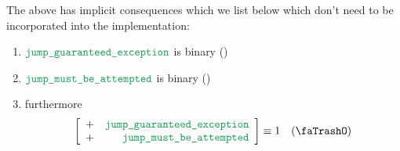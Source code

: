 \saNote{} The above has implicit consequences which we list below which don't need to be incorporated into the implementation:
\begin{enumerate}
	\item $\locJumpGuaranteedException$ is binary \quad (\trash)
	\item $\locJumpMustBeAttempted    $ is binary \quad (\trash)
	\item furthermore
		\[
			\left[ \begin{array}{cr}
				+ & \locJumpGuaranteedException \\
				+ & \locJumpMustBeAttempted     \\
			\end{array} \right]
			\equiv 1
			\quad (\trash)
		\]
\end{enumerate}
